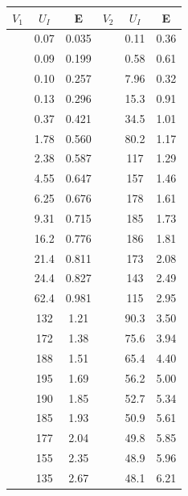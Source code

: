 \documentclass[a4paper,12pt]{article} %
\begin{document}
    \begin{table}[h!]
      \centering
      \begin{tabular}{|c|c|c|c|c|c|}
      \hline
      $V_1 $ & $U_I$ & E     & $V_2 $ & $U_I$ & E    \\ \hline
             & 0.07  & 0.035 &        & 0.11  & 0.36 \\ \hline
             & 0.09  & 0.199 &        & 0.58  & 0.61 \\ \hline
             & 0.10  & 0.257 &        & 7.96  & 0.32 \\ \hline
             & 0.13  & 0.296 &        & 15.3  & 0.91 \\ \hline
             & 0.37  & 0.421 &        & 34.5  & 1.01 \\ \hline
             & 1.78  & 0.560 &        & 80.2  & 1.17 \\ \hline
             & 2.38  & 0.587 &        & 117   & 1.29 \\ \hline
             & 4.55  & 0.647 &        & 157   & 1.46 \\ \hline
             & 6.25  & 0.676 &        & 178   & 1.61 \\ \hline
             & 9.31  & 0.715 &        & 185   & 1.73 \\ \hline
             & 16.2  & 0.776 &        & 186   & 1.81 \\ \hline
             & 21.4  & 0.811 &        & 173   & 2.08 \\ \hline
             & 24.4  & 0.827 &        & 143   & 2.49 \\ \hline
             & 62.4  & 0.981 &        & 115   & 2.95 \\ \hline
             & 132   & 1.21  &        & 90.3  & 3.50 \\ \hline
             & 172   & 1.38  &        & 75.6  & 3.94 \\ \hline
             & 188   & 1.51  &        & 65.4  & 4.40 \\ \hline
             & 195   & 1.69  &        & 56.2  & 5.00 \\ \hline
             & 190   & 1.85  &        & 52.7  & 5.34 \\ \hline
             & 185   & 1.93  &        & 50.9  & 5.61 \\ \hline
             & 177   & 2.04  &        & 49.8  & 5.85 \\ \hline
             & 155   & 2.35  &        & 48.9  & 5.96 \\ \hline
             & 135   & 2.67  &        & 48.1  & 6.21 \\ \hline

\end{tabular}
\end{table}
\end{document}
